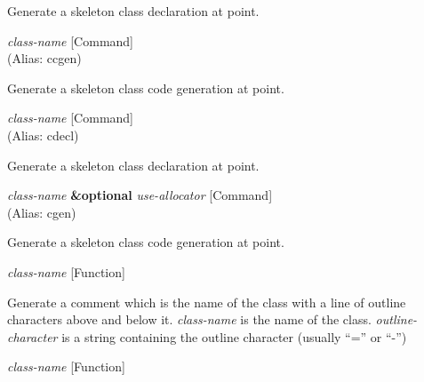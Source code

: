 \begin{doc-string}
Generate a skeleton class declaration at point.
\end{doc-string}

\vspace{1em}
\noindent
{}
\usebox{\funcname}\emph{class-name}
 \hfill [Command]\\%
 (Alias: ccgen)

\begin{doc-string}
Generate a skeleton class code generation at point.
\end{doc-string}

\vspace{1em}
\noindent
{}
\usebox{\funcname}\emph{class-name}
 \hfill [Command]\\%
 (Alias: cdecl)

\begin{doc-string}
Generate a skeleton class declaration at point.
\end{doc-string}

\vspace{1em}
\noindent
{}
\usebox{\funcname}\emph{class-name} \textbf{\&optional} \emph{use-allocator}
 \hfill [Command]\\%
 (Alias: cgen)

\begin{doc-string}
Generate a skeleton class code generation at point.
\end{doc-string}

\vspace{1em}
\noindent
{}
\usebox{\funcname}\emph{class-name}
 \hfill [Function]
\hspace*{\wd\funcname}

\begin{doc-string}
Generate a comment which is the name of the class with a line of outline
characters above and below it.  \emph{class-name} is the name of the class.
\emph{outline-character} is a string containing the outline character (usually
``='' or ``-'')
\end{doc-string}

\vspace{1em}
\noindent
{}
\usebox{\funcname}\emph{class-name}
 \hfill [Function]

